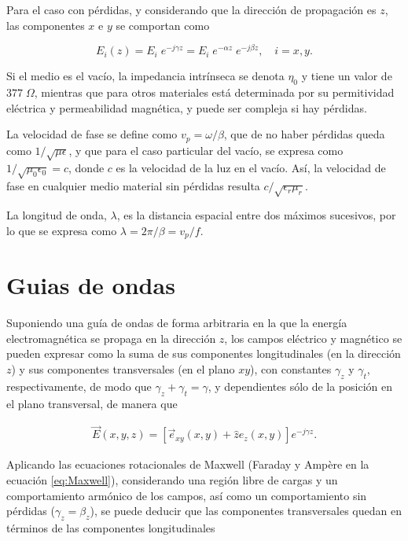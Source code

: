 Para el caso con pérdidas, y considerando que la dirección de propagación es $z$, las componentes $x$ e $y$ se comportan como

\begin{equation}
E_i(z) = E_i \; e^{-j\gamma z} = E_i \; e^{-\alpha z} \; e^{-j \beta z}, \quad i=x,y. \nonumber
\end{equation}

Si el medio es el vacío, la impedancia intrínseca se denota $\eta_0$ y tiene un valor de $377\; \Omega$, mientras que para otros materiales está determinada por su permitividad eléctrica y permeabilidad magnética, y puede ser compleja si hay pérdidas.

La velocidad de fase se define como $v_p=\omega/\beta$, que de no haber pérdidas queda como $1/\sqrt{\mu \epsilon}$, y que para el caso particular del vacío, se expresa como $1/\sqrt{\mu_0 \epsilon_0} = c$, donde $c$ es la velocidad de la luz en el vacío. Así, la velocidad de fase en cualquier medio material sin pérdidas resulta $c/\sqrt{\epsilon_r \mu_r}$.

La longitud de onda, $\lambda$, es la distancia espacial entre dos máximos sucesivos, por lo que se expresa como $\lambda = 2\pi / \beta = v_p/f$.

\section{Guias de ondas}
\label{subsec_guias_de_ondas}

Suponiendo una guía de ondas de forma arbitraria en la que la energía electromagnética se propaga en la dirección $z$, los campos eléctrico y magnético se pueden expresar como la suma de sus componentes longitudinales (en la dirección $z$) y sus componentes transversales (en el plano $xy$), con constantes $\gamma_z$ y $\gamma_t$, respectivamente, de modo que $\gamma_z + \gamma_t = \gamma$, y dependientes sólo de la posición en el plano transversal, de manera que

\begin{align}
	\vec{E}(x,y,z) = \left[ \vec{e}_{xy}(x,y) + \hat{z} e_z(x,y) \right] e^{-j\gamma z}.
\end{align}

Aplicando las ecuaciones rotacionales de Maxwell (Faraday y Ampère en la ecuación \ref{eq:Maxwell}), considerando una región libre de cargas y un comportamiento armónico de los campos, así como un comportamiento sin pérdidas ($\gamma_z = \beta_z$), se puede deducir que las componentes transversales quedan en términos de las componentes longitudinales \cite{Fernandez:Electromag}

